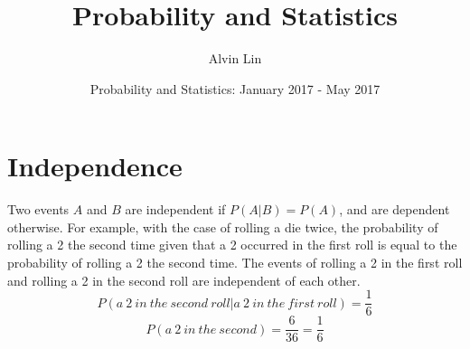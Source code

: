 \documentclass[letterpaper, 12pt]{math}
\title{Probability and Statistics}
\author{Alvin Lin}
\date{Probability and Statistics: January 2017 - May 2017}
\begin{document}
\maketitle

\section*{Independence}
Two events \( A \) and \( B \) are independent if \( P(A|B) = P(A) \), and are
dependent otherwise. For example, with the case of rolling a die twice, the
probability of rolling a 2 the second time given that a 2 occurred in the first
roll is equal to the probability of rolling a 2 the second time. The events of
rolling a 2 in the first roll and rolling a 2 in the second roll are
independent of each other.
\[ P(a\ 2\ in\ the\ second\ roll|a\ 2\ in\ the\ first\ roll) = \frac{1}{6} \]
\[ P(a\ 2\ in\ the\ second) = \frac{6}{36} = \frac{1}{6} \]
\end{document}
